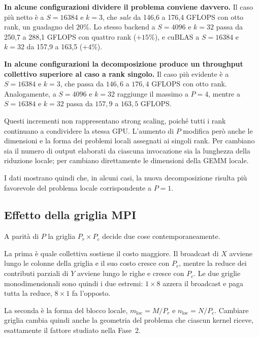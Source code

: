 \textbf{In alcune configurazioni dividere il problema conviene davvero.} Il caso
più netto è  a $S=16384$ e $k=3$, che \emph{sale} da
146,6 a 176,4 GFLOPS con otto rank, un guadagno del $20\%$. Lo stesso backend a
$S=4096$ e $k=32$ passa da 250,7 a 288,1 GFLOPS con quattro rank ($+15\%$), e
cuBLAS a $S=16384$ e $k=32$ da 157,9 a 163,5 ($+4\%$).

\textbf{In alcune configurazioni la decomposizione produce un throughput
collettivo superiore al caso a rank singolo.}
Il caso più evidente è  a $S=16384$ e $k=3$, che
passa da $146{,}6$ a $176{,}4$ GFLOPS con otto rank. Analogamente,
 a $S=4096$ e $k=32$ raggiunge il massimo a
$P=4$, mentre  a $S=16384$ e $k=32$ passa da
$157{,}9$ a $163{,}5$ GFLOPS.

Questi incrementi non rappresentano strong scaling, poiché tutti i rank
continuano a condividere la stessa GPU. L'aumento di $P$ modifica però anche
le dimensioni e la forma dei problemi locali assegnati ai singoli rank.
Per  cambiano sia il numero di output elaborati da
ciascuna invocazione sia la lunghezza della riduzione locale; per
 cambiano direttamente le dimensioni della GEMM locale.

I dati mostrano quindi che, in alcuni casi, la nuova decomposizione risulta
più favorevole del problema locale corrispondente a $P=1$. 

\subsection{Effetto della griglia MPI}
\label{sec:ris-fase4-griglia}

A parità di $P$ la griglia $P_r\times P_c$ decide due cose contemporaneamente.

La prima è quale collettiva sostiene il costo maggiore. Il broadcast di $X$
avviene lungo le colonne della griglia e il suo costo cresce con $P_r$, mentre la
reduce dei contributi parziali di $Y$ avviene lungo le righe e cresce con $P_c$.
Le due griglie monodimensionali sono quindi i due estremi: $1\times8$ azzera il
broadcast e paga tutta la reduce, $8\times1$ fa l'opposto.

La seconda è la forma del blocco locale, $m_{\text{loc}}=M/P_r$ e
$n_{\text{loc}}=N/P_c$. Cambiare griglia cambia quindi anche la geometria del
problema che ciascun kernel riceve, esattamente il fattore studiato nella
Fase~2.

